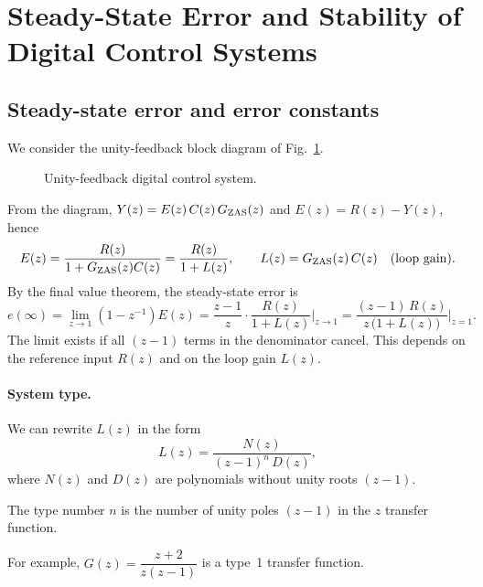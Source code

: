 \section{Steady-State Error and Stability of Digital Control Systems}\label{sec:analysis}


\subsection{Steady-state error and error constants}
We consider the unity-feedback block diagram of Fig.~\ref{fig:ufb}.

\begin{figure}[ht]
\centering
{}
\caption{Unity-feedback digital control system.}\label{fig:ufb}
\end{figure}

From the diagram, $Y(z)=E(z)\,C(z)\,G_{\mathrm{ZAS}}(z)$ and $E(z)=R(z)-Y(z)$, hence
\begin{equation}
  E(z)=\frac{R(z)}{1+G_{\mathrm{ZAS}}(z)C(z)}=\frac{R(z)}{1+L(z)},\qquad L(z)=G_{\mathrm{ZAS}}(z)\,C(z)\quad\text{(loop gain).}
\end{equation}
By the final value theorem, the steady-state error is
\begin{equation}\label{eq:ess-star}
  e(\infty)=\lim_{z\to1}(1-z^{-1})E(z)=\frac{z-1}{z}\cdot\frac{R(z)}{1+L(z)}\Big|_{z\to1}
  =\frac{(z-1)\,R(z)}{z\,\bigl(1+L(z)\bigr)}\Big|_{z=1}.\tag{$*$}
\end{equation}
The limit exists if all $(z-1)$ terms in the denominator cancel. This depends on the reference input
$R(z)$ and on the loop gain $L(z)$.

\paragraph{System type.} We can rewrite $L(z)$ in the form
\begin{equation}
  L(z)=\frac{N(z)}{(z-1)^{n}\,D(z)},
\end{equation}
where $N(z)$ and $D(z)$ are polynomials without unity roots $(z-1)$.

\begin{definition}
The type number $n$ is the number of unity poles $(z-1)$ in the $z$ transfer function.
\end{definition}
For example, $G(z)=\dfrac{z+2}{z(z-1)}$ is a type~1 transfer function.

